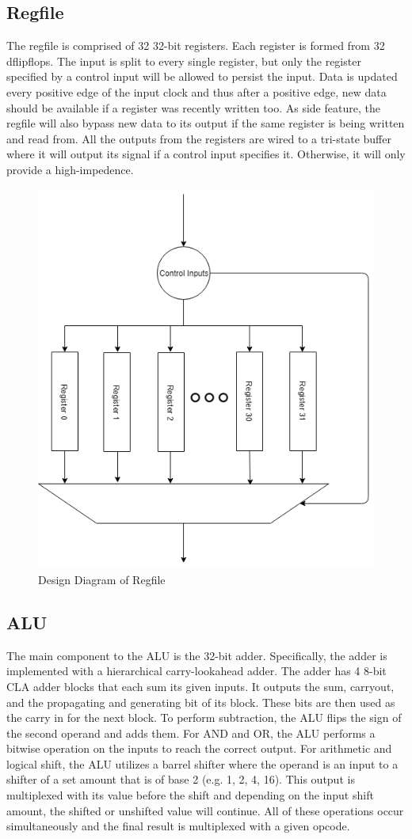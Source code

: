 \documentclass[letterpaper]{article} %
\begin{document}
\subsection*{Regfile}

The regfile is comprised of 32 32-bit registers. Each register is formed from 32 dflipflops. The input is split to every single register, but only the register specified by a control input will be allowed to persist the input. Data is updated every positive edge of the input clock and thus after a positive edge, new data should be available if a register was recently written too. As side feature, the regfile will also bypass new data to its output if the same register is being written and read from. All the outputs from the registers are wired to a tri-state buffer where it will output its signal if a control input specifies it. Otherwise, it will only provide a high-impedence.

\begin{figure}[htb!]
    \centering
    \includegraphics[width=.35\textwidth]{regfileDiagram.png}
    \caption{Design Diagram of Regfile}
\end{figure}

\newpage

\subsection*{ALU}

The main component to the ALU is the 32-bit adder. Specifically, the adder is implemented with a hierarchical carry-lookahead adder. The adder has 4 8-bit CLA adder blocks that each sum its given inputs. It outputs the sum, carryout, and the propagating and generating bit of its block. These bits are then used as the carry in for the next block. To perform subtraction, the ALU flips the sign of the second operand and adds them. For AND and OR, the ALU performs a bitwise operation on the inputs to reach the correct output. For arithmetic and logical shift, the ALU utilizes a barrel shifter where the operand is an input to a shifter of a set amount that is of base 2 (e.g. 1, 2, 4, 16). This output is multiplexed with its value before the shift and depending on the input shift amount, the shifted or unshifted value will continue. All of these operations occur simultaneously and the final result is multiplexed with a given opcode.
\end{document}
